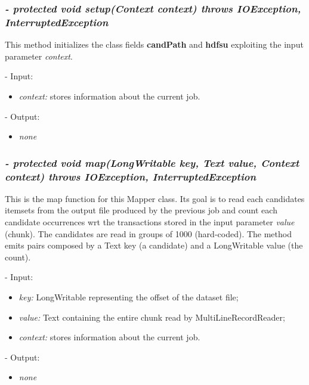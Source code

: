 \documentclass[]{report}
\begin{document}
	\subsubsection*{\textit{\textbf{-} protected void setup(Context context) throws IOException, InterruptedException}}   	
	This method initializes the class fields \textbf{candPath} and \textbf{hdfsu} exploiting the input parameter \textit{context}.    
	\begin{description}
		\item - Input:
		\begin{itemize}
			\item \textit{context:} stores information about the current job.
		\end{itemize}
	\end{description}	
	\begin{description}
		\item - Output:
		\begin{itemize}
			\item \textit{none} 
		\end{itemize}
	\end{description}
	
	\subsubsection*{\textit{\textbf{-} protected void map(LongWritable key, Text value, Context context) throws IOException, InterruptedException}}   	
	This is the map function for this Mapper class. Its goal is to read each candidates itemsets from the output file produced by the previous job and count each candidate occurrences wrt the transactions stored in the input parameter \textit{value} (chunk). The candidates are read in groups of 1000 (hard-coded). The method emits pairs composed by a Text key (a candidate) and a LongWritable value (the count).  
	\begin{description}
		\item - Input:
		\begin{itemize}
			\item \textit{key:} LongWritable representing the offset of the dataset file;
			\item \textit{value:} Text containing the entire chunk read by MultiLineRecordReader;
			\item \textit{context:} stores information about the current job.
		\end{itemize}
	\end{description}	
	\begin{description}
		\item - Output:
		\begin{itemize}
			\item \textit{none} 
		\end{itemize}
	\end{description}
	
\end{document}
